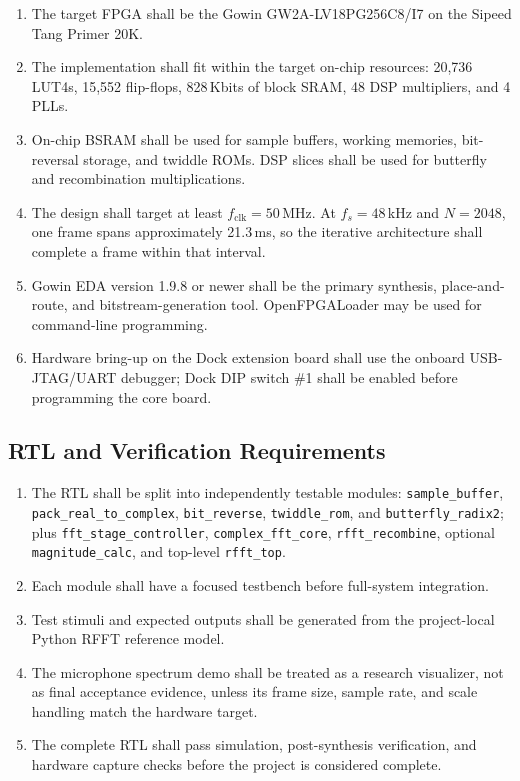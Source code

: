 \documentclass[12pt, a4paper]{article}
\begin{document}
\begin{enumerate}[leftmargin=*, label=\textbf{HW-\arabic*:}]
    \item The target FPGA shall be the Gowin GW2A-LV18PG256C8/I7 on the Sipeed
          Tang Primer 20K.
    \item The implementation shall fit within the target on-chip resources:
          20,736 LUT4s, 15,552 flip-flops, 828\,Kbits of block SRAM,
          48 DSP multipliers, and 4 PLLs.
    \item On-chip BSRAM shall be used for sample buffers, working memories,
          bit-reversal storage, and twiddle ROMs. DSP slices shall be used for
          butterfly and recombination multiplications.
    \item The design shall target at least $f_\text{clk}=50$\,MHz. At
          $f_s=48$\,kHz and $N=2048$, one frame spans approximately
          21.3\,ms, so the iterative architecture shall complete a frame within
          that interval.
    \item Gowin EDA version 1.9.8 or newer shall be the primary synthesis,
          place-and-route, and bitstream-generation tool. OpenFPGALoader may be
          used for command-line programming.
    \item Hardware bring-up on the Dock extension board shall use the onboard
          USB-JTAG/UART debugger; Dock DIP switch \#1 shall be enabled before
          programming the core board.
\end{enumerate}

\subsection{RTL and Verification Requirements}

\begin{enumerate}[leftmargin=*, label=\textbf{RTL-\arabic*:}]
    \item The RTL shall be split into independently testable modules:
          \texttt{sample\_buffer}, \texttt{pack\_real\_to\_complex},
          \texttt{bit\_reverse}, \texttt{twiddle\_rom}, and
          \texttt{butterfly\_radix2}; plus \texttt{fft\_stage\_controller},
          \texttt{complex\_fft\_core}, \texttt{rfft\_recombine}, optional
          \texttt{magnitude\_calc}, and top-level \texttt{rfft\_top}.
    \item Each module shall have a focused testbench before full-system
          integration.
    \item Test stimuli and expected outputs shall be generated from the
          project-local Python RFFT reference model.
    \item The microphone spectrum demo shall be treated as a research
          visualizer, not as final acceptance evidence, unless its frame size,
          sample rate, and scale handling match the hardware target.
    \item The complete RTL shall pass simulation, post-synthesis verification,
          and hardware capture checks before the project is considered
          complete.
\end{enumerate}
\end{document}
